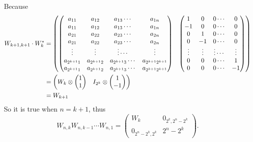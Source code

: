 \documentclass[12pt]{article}
\begin{document}
Because 
\begin{align*}
W_{k+1, k+1} \cdot W_{k}^* &=
\begin{pmatrix}
\begin{pmatrix}
a_{11} & a_{12} & a_{13} \cdots &a_{1n} \\
a_{11} & a_{12} & a_{13} \cdots &a_{1n} \\
a_{21} & a_{22} & a_{23} \cdots &a_{2n} \\
a_{21} & a_{22} & a_{23} \cdots &a_{2n} \\
\vdots &\vdots  &\vdots  \cdots &\vdots \\
a_{2^{k+1}1} & a_{2^{k+1}2} & a_{2^{k+1}3} \cdots &a_{2^{k+1}2^{k+1}} \\
a_{2^{k+1}1} & a_{2^{k+1}2} & a_{2^{k+1}3} \cdots &a_{2^{k+1}2^{k+1}} \\
\end{pmatrix}
&
\begin{pmatrix}
1 &0 & 0 \cdots &0 \\
-1 &0 & 0 \cdots &0 \\
0 & 1 & 0 \cdots &0 \\
0 & -1 & 0 \cdots &0 \\
\vdots &\vdots  &\vdots  \cdots &\vdots \\
0 & 0 & 0 \cdots &1 \\
0 & 0 & 0 \cdots &-1 \\
\end{pmatrix} 
\end{pmatrix} \\
&=
\begin{pmatrix}
W_{k} \otimes 
\begin{pmatrix}
1 \\
1
\end{pmatrix}
&
I_{2^{k}} \otimes 
\begin{pmatrix}
1 \\
-1
\end{pmatrix}
\end{pmatrix} \\
&= W_{k+1}
\end{align*}
So it is true when $n = k + 1$, thus 
\[
W_{n, k} W_{n, k - 1}\cdots W_{n, 1} = 
\begin{pmatrix}
 W_{k} & 0_{2^{k}, 2^{n} - 2^{k}} \\
0_{2^{n}- 2^{k}, 2^k} & {2^{n} - 2^{k}}
\end{pmatrix}.
\]
\end{document}
